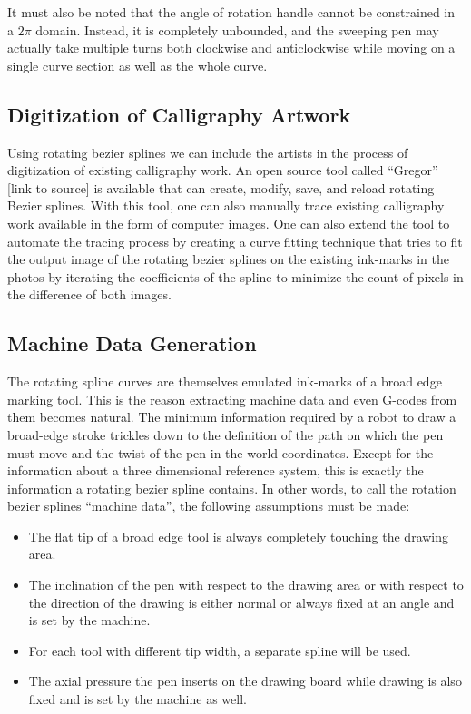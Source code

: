     It must also be noted that the angle of rotation handle cannot be constrained in a $2\pi$ domain. Instead, it is completely unbounded, and the sweeping pen may actually take multiple turns both clockwise and anticlockwise while moving on a single curve section as well as the whole curve.

    \subsection{Digitization of Calligraphy Artwork}
    Using rotating bezier splines we can include the artists in the process of digitization of existing calligraphy work. An open source tool called ``Gregor'' [link to source] is available that can create, modify, save, and reload rotating Bezier splines. With this tool, one can also manually trace existing calligraphy work available in the form of computer images. One can also extend the tool to automate the tracing process by creating a curve fitting technique that tries to fit the output image of the rotating bezier splines on the existing ink-marks in the photos by iterating the coefficients of the spline to minimize the count of pixels in the difference of both images.

    \subsection{Machine Data Generation}
    \label{ExplorationPoints1}
    The rotating spline curves are themselves emulated ink-marks of a broad edge marking tool. This is the reason extracting machine data and even G-codes from them becomes natural. The minimum information required by a robot to draw a broad-edge stroke trickles down to the definition of the path on which the pen must move and the twist of the pen in the world coordinates. Except for the information about a three dimensional reference system, this is exactly the information a rotating bezier spline contains. In other words, to call the rotation bezier splines ``machine data'', the following assumptions must be made:

    \begin{itemize}
        \item The flat tip of a broad edge tool is always completely touching the drawing area.
    	\item The inclination of the pen with respect to the drawing area or with respect to the direction of the drawing is either normal or always fixed at an angle and is set by the machine.
    	\item For each tool with different tip width, a separate spline will be used.
    	\item The axial pressure the pen inserts on the drawing board while drawing is also fixed and is set by the machine as well.

    \end{itemize}

